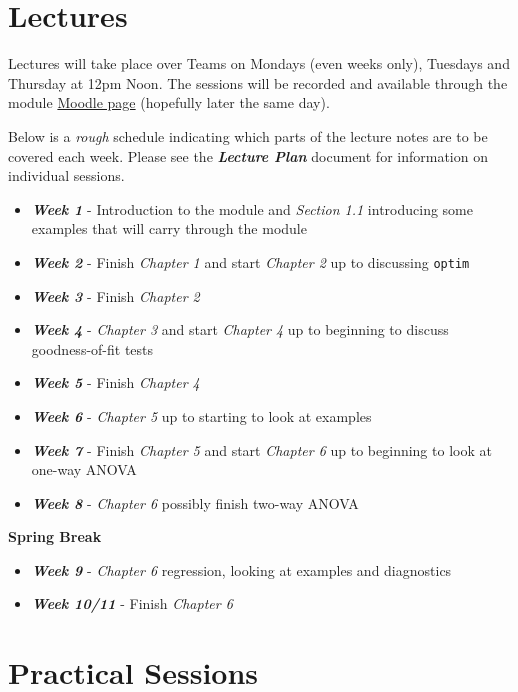\documentclass[
  openany]{book}
\providecommand{\tightlist}{%
  \setlength{\itemsep}{0pt}\setlength{\parskip}{0pt}}
\begin{document}
\hypertarget{lectures}{%
\section*{Lectures}\label{lectures}}

Lectures will take place over Teams on Mondays (even weeks only), Tuesdays and Thursday at 12pm Noon. The sessions will be recorded and available through the module \href{https://moody.st-andrews.ac.uk/moodle/}{Moodle page} (hopefully later the same day).

Below is a \emph{rough} schedule indicating which parts of the lecture notes are to be covered each week. Please see the \textbf{\emph{Lecture Plan}} document for information on individual sessions.

\begin{itemize}
\tightlist
\item
  \textbf{\emph{Week 1}} - Introduction to the module and \emph{Section 1.1} introducing some examples that will carry through the module
\item
  \textbf{\emph{Week 2}} - Finish \emph{Chapter 1} and start \emph{Chapter 2} up to discussing \texttt{optim}
\item
  \textbf{\emph{Week 3}} - Finish \emph{Chapter 2}
\item
  \textbf{\emph{Week 4}} - \emph{Chapter 3} and start \emph{Chapter 4} up to beginning to discuss goodness-of-fit tests
\item
  \textbf{\emph{Week 5}} - Finish \emph{Chapter 4}
\item
  \textbf{\emph{Week 6}} - \emph{Chapter 5} up to starting to look at examples
\item
  \textbf{\emph{Week 7}} - Finish \emph{Chapter 5} and start \emph{Chapter 6} up to beginning to look at one-way ANOVA
\item
  \textbf{\emph{Week 8}} - \emph{Chapter 6} possibly finish two-way ANOVA
\end{itemize}

\textbf{Spring Break}

\begin{itemize}
\tightlist
\item
  \textbf{\emph{Week 9}} - \emph{Chapter 6} regression, looking at examples and diagnostics
\item
  \textbf{\emph{Week 10/11}} - Finish \emph{Chapter 6}
\end{itemize}

\hypertarget{practical-sessions}{%
\section*{Practical Sessions}\label{practical-sessions}}
\end{document}
